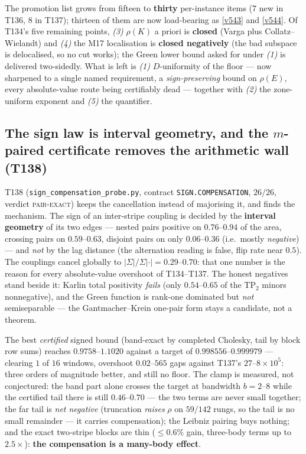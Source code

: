 \documentclass[11pt,a4paper]{article}
\begin{document}
\begin{keybox}
The promotion list grows from fifteen to \textbf{thirty} per-instance items ($7$ new in T136, $8$ in
T137); thirteen of them are now load-bearing as \vref{v543} and \vref{v544}. Of T134's five remaining
points, \emph{(3)} $\rho(K)$ a priori is \textbf{closed} (Varga plus Collatz--Wielandt) and
\emph{(4)} the M17 localisation is \textbf{closed negatively} (the bad subspace is delocalised, so no
cut works); the Green lower bound asked for under \emph{(1)} is delivered two-sidedly. What is left is
\emph{(1)} $D$-uniformity of the floor --- now sharpened to a single named requirement, a
\emph{sign-preserving} bound on $\rho(E)$, every absolute-value route being certifiably dead ---
together with \emph{(2)} the zone-uniform exponent and \emph{(5)} the quantifier.
\end{keybox}

\subsection{The sign law is interval geometry, and the $m$-paired certificate removes the arithmetic wall (T138)}
T138 (\texttt{sign\_compensation\_probe.py}, contract \texttt{SIGN.COMPENSATION}, $26/26$, verdict
\textsc{pair-exact}) keeps the cancellation instead of majorising it, and finds the mechanism. The
sign of an inter-stripe coupling is decided by the \textbf{interval geometry} of its two edges ---
nested pairs positive on $0.76$--$0.94$ of the area, crossing pairs on $0.59$--$0.63$, disjoint pairs
on only $0.06$--$0.36$ (i.e.\ mostly \emph{negative}) --- and \emph{not} by the lag distance (the
alternation reading is false, flip rate near $0.5$). The couplings cancel globally to
$|\Sigma|/\Sigma|\cdot|=0.29$--$0.70$: that one number is the reason for every absolute-value
overshoot of T134--T137. The honest negatives stand beside it: Karlin total positivity \emph{fails}
(only $0.54$--$0.65$ of the TP$_2$ minors nonnegative), and the Green function is rank-one dominated
but \emph{not} semiseparable --- the Gantmacher--Krein one-pair form stays a candidate, not a theorem.

The best \emph{certified} signed bound (band-exact by completed Cholesky, tail by block row sums)
reaches $0.9758$--$1.1020$ against a target of $0.998556$--$0.999979$ --- clearing $1$ of $16$
windows, overshoot $0.02$--$565$ gaps against T137's $27$--$8\times10^{5}$: three orders of magnitude
better, and still no floor. The clamp is measured, not conjectured: the band part alone crosses the
target at bandwidth $b=2$--$8$ while the certified tail there is still $0.46$--$0.70$ --- the two
terms are never small together; the far tail is \emph{net negative} (truncation \emph{raises} $\rho$
on $59/142$ rungs, so the tail is no small remainder --- it carries compensation); the Leibniz
pairing buys nothing; and the exact two-stripe blocks are thin ($\le0.6\%$ gain, three-body terms up
to $2.5\times$): \textbf{the compensation is a many-body effect}.
\end{document}
